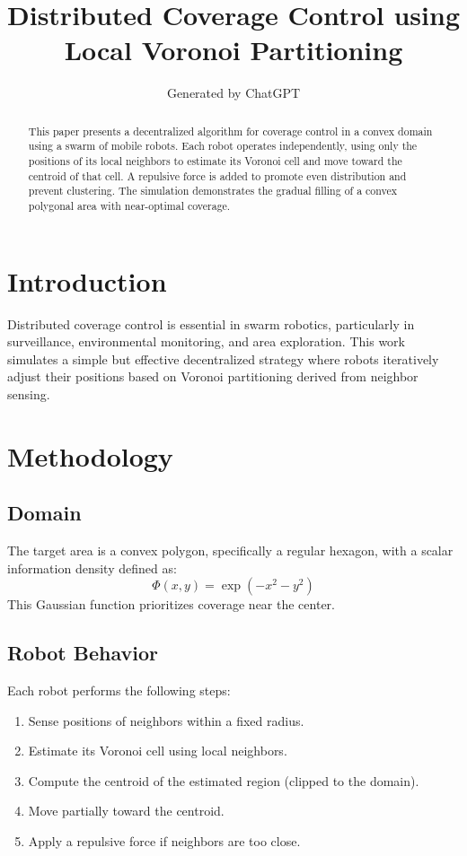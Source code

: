 \documentclass[11pt]{article}
\title{Distributed Coverage Control using Local Voronoi Partitioning}
\author{Generated by ChatGPT}
\date{}
\begin{document}
\maketitle

\begin{abstract}
This paper presents a decentralized algorithm for coverage control in a convex domain using a swarm of mobile robots. Each robot operates independently, using only the positions of its local neighbors to estimate its Voronoi cell and move toward the centroid of that cell. A repulsive force is added to promote even distribution and prevent clustering. The simulation demonstrates the gradual filling of a convex polygonal area with near-optimal coverage.
\end{abstract}

\section{Introduction}
Distributed coverage control is essential in swarm robotics, particularly in surveillance, environmental monitoring, and area exploration. This work simulates a simple but effective decentralized strategy where robots iteratively adjust their positions based on Voronoi partitioning derived from neighbor sensing.

\section{Methodology}
\subsection{Domain}
The target area is a convex polygon, specifically a regular hexagon, with a scalar information density defined as:
\[
\Phi(x, y) = \exp(-x^2 - y^2)
\]
This Gaussian function prioritizes coverage near the center.

\subsection{Robot Behavior}
Each robot performs the following steps:
\begin{enumerate}
    \item Sense positions of neighbors within a fixed radius.
    \item Estimate its Voronoi cell using local neighbors.
    \item Compute the centroid of the estimated region (clipped to the domain).
    \item Move partially toward the centroid.
    \item Apply a repulsive force if neighbors are too close.
\end{enumerate}
\end{document}
